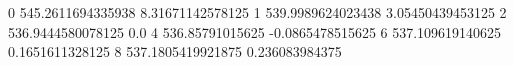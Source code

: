 0 545.2611694335938 8.31671142578125
1 539.9989624023438 3.05450439453125
2 536.9444580078125 0.0
4 536.85791015625 -0.0865478515625
6 537.109619140625 0.1651611328125
8 537.1805419921875 0.236083984375
